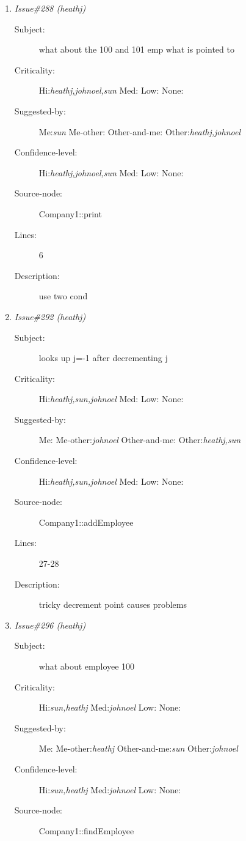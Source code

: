 \begin{enumerate}
\begin{description}
\item [Lines:] 22-26

\item [Description:] leaves two with the same name
\end{description}
\item {\it Issue\#288 (heathj)}
\begin{description}
\item [Subject:] what about the 100 and 101 emp what is pointed to
\item [Criticality:] Hi:{\it heathj,johnoel,sun} Med:{\it } Low:{\it } None:{\it }
\item [Suggested-by:] Me:{\it sun} Me-other:{\it } Other-and-me:{\it } Other:{\it heathj,johnoel}
\item [Confidence-level:] Hi:{\it heathj,johnoel,sun} Med:{\it } Low:{\it } None:{\it }
\item [Source-node:] Company1::print

\item [Lines:] 6

\item [Description:] use two cond
\end{description}
\item {\it Issue\#292 (heathj)}
\begin{description}
\item [Subject:] looks up j=-1 after decrementing j
\item [Criticality:] Hi:{\it heathj,sun,johnoel} Med:{\it } Low:{\it } None:{\it }
\item [Suggested-by:] Me:{\it } Me-other:{\it johnoel} Other-and-me:{\it } Other:{\it heathj,sun}
\item [Confidence-level:] Hi:{\it heathj,sun,johnoel} Med:{\it } Low:{\it } None:{\it }
\item [Source-node:] Company1::addEmployee

\item [Lines:] 27-28

\item [Description:] tricky decrement point causes problems
\end{description}
\item {\it Issue\#296 (heathj)}
\begin{description}
\item [Subject:] what about employee 100
\item [Criticality:] Hi:{\it sun,heathj} Med:{\it johnoel} Low:{\it } None:{\it }
\item [Suggested-by:] Me:{\it } Me-other:{\it heathj} Other-and-me:{\it sun} Other:{\it johnoel}
\item [Confidence-level:] Hi:{\it sun,heathj} Med:{\it johnoel} Low:{\it } None:{\it }
\item [Source-node:] Company1::findEmployee


\end{description}
\end{enumerate}
